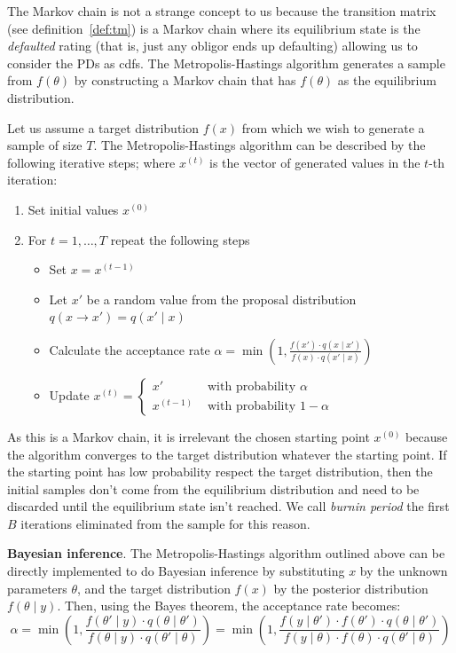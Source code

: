 \documentclass[11pt,fleqn]{book} %
\begin{document}
The Markov chain is not a strange concept to us because the transition 
matrix (see definition~\ref{def:tm}) is a Markov chain where its 
equilibrium state is the \emph{defaulted} rating (that is, just any 
obligor ends up defaulting) allowing us to consider the PDs as cdfs.
The Metropolis-Hastings algorithm generates a sample from $f(\theta)$ 
by constructing a Markov chain that has $f(\theta)$ as the equilibrium 
distribution.

\begin{algorithm}
	Let us assume a target distribution $f(x)$ from which we wish to 
	generate a sample of size $T$. The Metropolis-Hastings algorithm can 
	be described by the following iterative steps; where $x^{(t)}$ is the 
	vector of generated values in the $t$-th iteration:
	\begin{enumerate}
		\item Set initial values $x^{(0)}$
		\item For $t=1,\dots,T$ repeat the following steps
		\begin{itemize}
			\item Set $x=x^{(t-1)}$
			\item Let $x'$ be a random value from the proposal distribution 
			$q(x \to x')=q(x' \mid x)$
			\item Calculate the acceptance rate 
			$\alpha = \min\left(1,\frac{f(x') \cdot q(x \mid x')}{f(x) \cdot q(x' \mid x)}\right)$
			\item Update $x^{(t)}=\left\{
			\begin{array}{ll}
				x'        & \text{ with probability } \alpha   \\
				x^{(t-1)} & \text{ with probability } 1-\alpha 
			\end{array}\right.$ 
		\end{itemize}
	\end{enumerate}
\end{algorithm}

As this is a Markov chain, it is irrelevant the chosen starting point 
$x^{(0)}$ because the algorithm converges to the target distribution
whatever the starting point. If the starting point has low probability 
respect the target distribution, then the initial samples don't come 
from the equilibrium distribution and need to be discarded until the 
equilibrium state isn't reached. We call \emph{burnin period} the first 
$B$ iterations eliminated from the sample for this reason.

\textbf{Bayesian inference}.
The Metropolis-Hastings algorithm outlined above can be directly implemented 
to do Bayesian inference by substituting $x$ by the unknown parameters 
$\theta$, and the target distribution $f(x)$ by the posterior distribution 
$f(\theta \mid y)$. Then, using the Bayes theorem, the acceptance rate 
becomes:
\begin{displaymath}
	\alpha = \min\left(1,\frac{f(\theta' \mid y) \cdot q(\theta \mid \theta')}{f(\theta \mid y) \cdot q(\theta' \mid \theta)}\right) = \min\left(1,\frac{f(y \mid \theta') \cdot f(\theta') \cdot q(\theta \mid \theta')}{f(y \mid \theta)  \cdot f(\theta) \cdot q(\theta' \mid \theta)}\right)
\end{displaymath}
\end{document}
